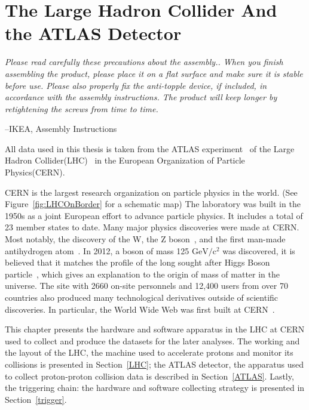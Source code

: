 \chapter{The Large Hadron Collider And the ATLAS Detector}
\label{chapter:ATLAS}

\epigraph{\textit{Please read carefully these precautions about the assembly.. When you finish assembling the product, please place it on a flat surface and make sure it is stable before use. Please also properly fix the anti-topple device, if included, in accordance with the assembly instructions. The product will keep longer by retightening the screws from time to time.}} {--IKEA, Assembly Instructions}

All data used in this thesis is taken from the ATLAS experiment~\cite{ATLAS:1999vwa} of the Large Hadron Collider(LHC)~\cite{Bruning:782076} in the European Organization of Particle Physics(CERN).

CERN is the largest research organization on particle physics in the world. (See Figure~\ref{fig:LHCOnBorder} for a schematic map) The laboratory was built in the 1950s as a joint European effort to advance particle physics. It includes a total of 23 member states to date. Many major physics discoveries were made at CERN. Most notably, the discovery of the W, the Z boson~\cite{hioki1982does}, and the first man-made antihydrogen atom~\cite{hioki1982does}. In 2012, a boson of mass 125
$\textrm{GeV}/\textrm{c}^{2}$ was discovered, it is believed that it matches the
profile of the long sought after Higgs Boson particle~\cite{chatrchyan2012observation}, which gives an explanation to the origin of mass of matter in the universe. The site with 2660 on-site personnels and 12,400 users from over 70 countries also produced many technological derivatives outside of scientific discoveries. In particular, the World Wide Web was first built at CERN~\cite{berners1994world}.

This chapter presents the hardware and software apparatus in the LHC at CERN used to collect and produce the datasets for the later analyses.
The working and the layout of the LHC, the machine used to accelerate protons and monitor its collisions is presented in Section~\ref{LHC}; the ATLAS detector, the apparatus used to collect proton-proton collision data is described in Section~\ref{ATLAS}. Lastly, the triggering chain: the hardware and software collecting strategy is presented in Section~\ref{trigger}.

